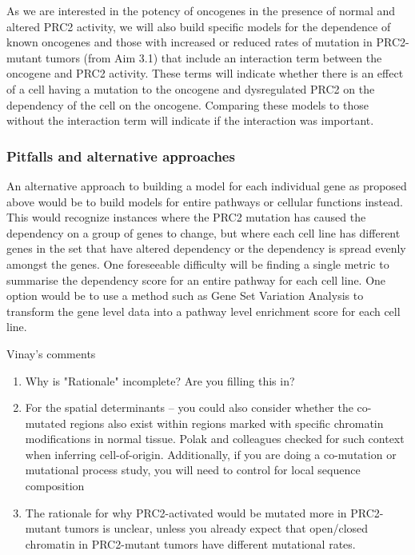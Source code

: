 As we are interested in the potency of oncogenes in the presence of normal and altered PRC2 activity, we will also build specific models for the dependence of known oncogenes and those with increased or reduced rates of mutation in PRC2-mutant tumors (from Aim 3.1) that include an interaction term between the oncogene and PRC2 activity.
These terms will indicate whether there is an effect of a cell having a mutation to the oncogene and dysregulated PRC2 on the dependency of the cell on the oncogene.
Comparing these models to those without the interaction term will indicate if the interaction was important.


\subsubsection*{Pitfalls and alternative approaches}

An alternative approach to building a model for each individual gene as proposed above would be to build models for entire pathways or cellular functions instead.
This would recognize instances where the PRC2 mutation has caused the dependency on a group of genes to change, but where each cell line has different genes in the set that have altered dependency or the dependency is spread evenly amongst the genes.
One foreseeable difficulty will be finding a single metric to summarise the dependency score for an entire pathway for each cell line.
One option would be to use a method such as Gene Set Variation Analysis \cite{Hanzelmann2013} to transform the gene level data into a pathway level enrichment score for each cell line.


{\color{red} 
Vinay's comments
\begin{enumerate}
    \item Why is "Rationale" incomplete? Are you filling this in?
    \item For the spatial determinants -- you could also consider whether the co-mutated regions also exist within regions marked with specific chromatin modifications in normal tissue. Polak and colleagues checked for such context when inferring cell-of-origin. Additionally, if you are doing a co-mutation or mutational process study, you will need to control for local sequence composition
    
    \item The rationale for why PRC2-activated would be mutated more in PRC2-mutant tumors is unclear, unless you already expect that open/closed chromatin in PRC2-mutant tumors have different mutational rates. 
\end{enumerate}
}